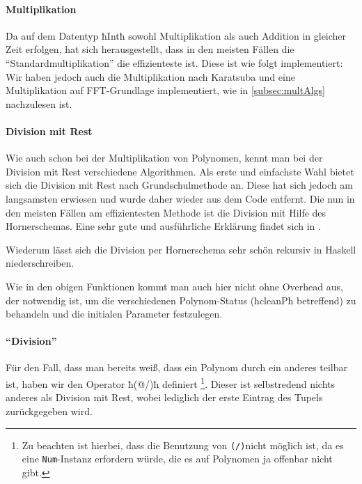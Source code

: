 \paragraph{Multiplikation}
Da auf dem Datentyp ħIntħ sowohl Multiplikation als auch Addition in gleicher
Zeit erfolgen, hat sich herausgestellt, dass in den meisten Fällen die 
"`Standardmultiplikation"' die effizienteste ist. Diese ist wie folgt
implementiert:
Wir haben jedoch auch die Multiplikation nach Karatsuba und eine Multiplikation
auf FFT-Grundlage implementiert, wie in \autoref{subsec:multAlgs} nachzulesen ist.

\paragraph{Division mit Rest}
Wie auch schon bei der Multiplikation von Polynomen, kennt man bei der Division
mit Rest verschiedene Algorithmen. Als erste und einfachste Wahl bietet sich
die Division mit Rest nach Grundschulmethode an. Diese hat sich jedoch am
langsamsten erwiesen und wurde daher wieder aus dem Code entfernt. Die nun in
den meisten Fällen am effizientesten Methode ist die Division mit Hilfe des
Hornerschemas. Eine sehr gute und ausführliche Erklärung findet sich 
in \autocite{wiki:synthetic-division}.

\begin{beispiel}
  
\end{beispiel}

Wiederum lässt sich die Division per Hornerschema sehr schön rekursiv in
Haskell niederschreiben.

Wie in den obigen Funktionen kommt man auch hier nicht ohne Overhead aus, der
notwendig ist, um die verschiedenen Polynom-Status (ħcleanPħ betreffend) zu
behandeln und die initialen Parameter festzulegen.

\paragraph{"`Division"'} Für den Fall, dass man bereits weiß, dass ein
Polynom durch ein anderes teilbar ist, haben wir den Operator ħ(@/)ħ definiert
\footnote{Zu beachten ist hierbei, dass die Benutzung 
von \lstinline{(/)}nicht möglich 
ist, da es eine \lstinline{Num}-Instanz erfordern würde, die es auf Polynomen ja
offenbar nicht gibt.}.
Dieser ist selbstredend nichts anderes als Division mit Rest, wobei lediglich
der erste Eintrag des Tupels zurückgegeben wird.

